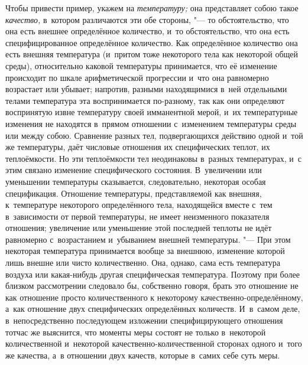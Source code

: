 Чтобы привести пример, укажем на {\em температуру;} она представляет собою
такое {\em качество,} в~котором различаются эти обе стороны, "--- то
обстоятельство, что она есть внешнее определённое количество, и~то
обстоятельство, что она есть специфицированное определённое количество. Как
определённое количество она есть внешняя температура (и~притом тоже некоторого
тела как некоторой общей среды), относительно каковой температуры принимается,
что её изменение происходит по шкале арифметической прогрессии и~что она
равномерно возрастает или убывает; напротив, разными находящимися в~ней
отдельными телами температура эта воспринимается по-разному, так как они
определяют воспринятую извне температуру своей имманентной мерой, и~их
температурные изменения не находятся в~прямом отношении с~изменением
температуры среды или между собою. Сравнение разных тел, подвергающихся
действию одной и~той же температуры, даёт числовые отношения их специфических
теплот, их теплоёмкости. Но эти теплоёмкости тел неодинаковы в~разных
температурах, и~с этим связано изменение специфического состояния. В~увеличении
или уменьшении температуры сказывается, следовательно, некоторая особая
спецификация. Отношение температуры, представляемой как внешняя, к~температуре
некоторого определённого тела, находящейся вместе с~тем в~зависимости от первой
температуры, не имеет неизменного показателя отношения; увеличение или
уменьшение этой последней теплоты не идёт равномерно с~возрастанием и~убыванием
внешней температуры. "--- При этом некоторая температура принимается вообще за
внешнюю, изменение которой лишь внешне или чисто количественно. Она, однако,
сама есть температура воздуха или какая-нибудь другая специфическая
температура. Поэтому при более близком рассмотрении следовало бы, собственно
говоря, брать это отношение не как отношение просто количественного к
некоторому качественно-определённому, а~как отношение двух специфических
определённых количеств. И~в~самом деле, в~непосредственно последующем изложении
специфицирующего отношения тотчас же выяснится, что моменты меры состоят не
только в~некоторой количественной и~некоторой качественно-количественной
сторонах одного и~того же качества, а~в отношении двух качеств, которые в~самих
себе суть меры.


